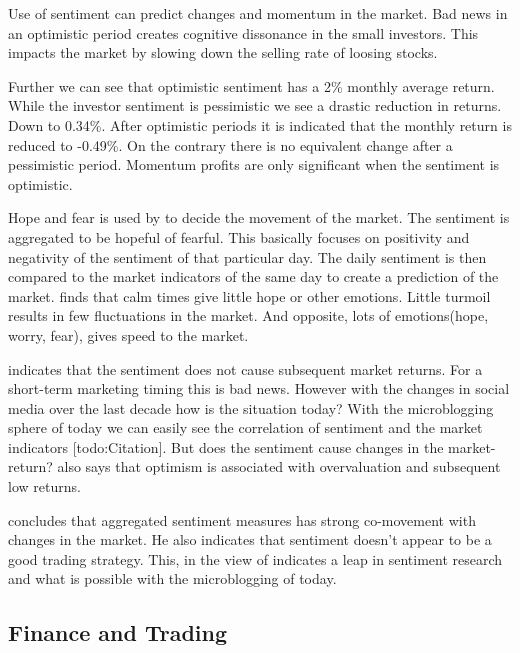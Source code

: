 Use of sentiment can predict changes and momentum in the market.
Bad news in an optimistic period creates cognitive dissonance in the small
investors. This impacts the market by slowing down the selling rate of loosing
stocks. \cite[p29]{doukas10:sentiment_and_momentum}

Further we can see that optimistic sentiment has a 2\% monthly average return.
While the investor sentiment is pessimistic we see a drastic reduction in
returns. Down to 0.34\%.\cite[p5]{doukas10:sentiment_and_momentum}
After optimistic periods it is indicated that the monthly return is reduced to
-0.49\%. On the contrary there is no equivalent change after a pessimistic
period. \cite[p6-7]{doukas10:sentiment_and_momentum}
Momentum profits are only significant when the sentiment is optimistic.
\cite[p29]{doukas10:sentiment_and_momentum}

Hope and fear is used by \cite[]{Zhang201155} to decide the movement of the
market. The sentiment is aggregated to be hopeful of fearful. This basically
focuses on positivity and negativity of the sentiment of that particular day.
The daily sentiment is then compared to the market indicators of the same day
to create a prediction of the market. \cite[]{Zhang201155} finds that calm
times give little hope or other emotions. Little turmoil results in few
fluctuations in the market. And opposite, lots of emotions(hope, worry, fear),
gives speed to the market.

\cite[p3]{Brown20041} indicates that the sentiment does not cause subsequent
market returns. For a short-term marketing timing this is bad news. However
with the changes in social media over the last decade how is the situation
today? With the microblogging sphere of today we can easily see the
correlation of sentiment and the market indicators [todo:Citation]. But
does the sentiment cause changes in the market-return?
\cite[p3]{Brown20041} also says that optimism is associated with overvaluation
and subsequent low returns.

\cite[p]{Brown20041} concludes that aggregated sentiment measures has strong
co-movement with changes in the market. He also indicates that sentiment
doesn't appear to be a good trading strategy. This, in the view of
\cite[]{Zhang201155} indicates a leap in sentiment research and what is possible
with the microblogging of today.

\subsection{Finance and Trading}

